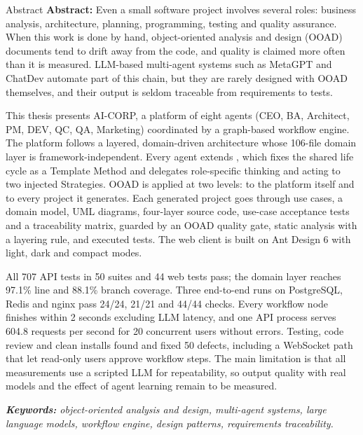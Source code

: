 \begin{preamble}{Abstract}
\textbf{Abstract:} Even a small software project involves several roles: business analysis, architecture, planning, programming, testing and quality assurance. When this work is done by hand, object-oriented analysis and design (OOAD) documents tend to drift away from the code, and quality is claimed more often than it is measured. LLM-based multi-agent systems such as MetaGPT and ChatDev automate part of this chain, but they are rarely designed with OOAD themselves, and their output is seldom traceable from requirements to tests.

This thesis presents AI-CORP, a platform of eight agents (CEO, BA, Architect, PM, DEV, QC, QA, Marketing) coordinated by a graph-based workflow engine. The platform follows a layered, domain-driven architecture whose 106-file domain layer is framework-independent. Every agent extends , which fixes the shared life cycle as a Template Method and delegates role-specific thinking and acting to two injected Strategies. OOAD is applied at two levels: to the platform itself and to every project it generates. Each generated project goes through use cases, a domain model, UML diagrams, four-layer source code, use-case acceptance tests and a traceability matrix, guarded by an OOAD quality gate, static analysis with a layering rule, and executed tests. The web client is built on Ant Design 6 with light, dark and compact modes.

All 707 API tests in 50 suites and 44 web tests pass; the domain layer reaches 97.1\% line and 88.1\% branch coverage. Three end-to-end runs on PostgreSQL, Redis and nginx pass 24/24, 21/21 and 44/44 checks. Every workflow node finishes within 2 seconds excluding LLM latency, and one API process serves 604.8 requests per second for 20 concurrent users without errors. Testing, code review and clean installs found and fixed 50 defects, including a WebSocket path that let read-only users approve workflow steps. The main limitation is that all measurements use a scripted LLM for repeatability, so output quality with real models and the effect of agent learning remain to be measured.

\vspace{0.5cm}
\textit{\textbf{Keywords:} object-oriented analysis and design, multi-agent systems, large language models, workflow engine, design patterns, requirements traceability.}
\end{preamble}

